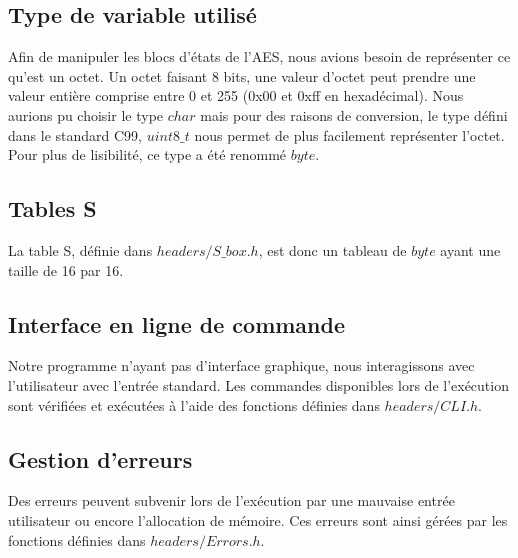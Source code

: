 \subsection{Type de variable utilisé}
Afin de manipuler les blocs d'états de l'AES, nous avions besoin de représenter ce qu'est un octet. Un octet faisant 8 bits, une valeur d'octet peut prendre une valeur entière comprise entre 0 et 255 (0x00 et 0xff en hexadécimal). 
\newline
Nous aurions pu choisir le type $char$ mais pour des raisons de conversion, le type défini dans le standard C99, $uint8\_t$ nous permet de plus facilement représenter l'octet. Pour plus de lisibilité, ce type a été renommé $byte$.


\subsection{Tables S}
La table S, définie dans $headers/S\_box.h$, est donc un tableau de $byte$ ayant une taille de 16 par 16.


\subsection{Interface en ligne de commande}
Notre programme n'ayant pas d'interface graphique, nous interagissons avec l'utilisateur avec l'entrée standard.
\newline
Les commandes disponibles lors de l'exécution sont vérifiées et exécutées à l'aide des fonctions définies dans $headers/CLI.h$.

\subsection{Gestion d'erreurs}
Des erreurs peuvent subvenir lors de l'exécution par une mauvaise entrée utilisateur ou encore l'allocation de mémoire. Ces erreurs sont ainsi gérées par les fonctions définies dans $headers/Errors.h$.